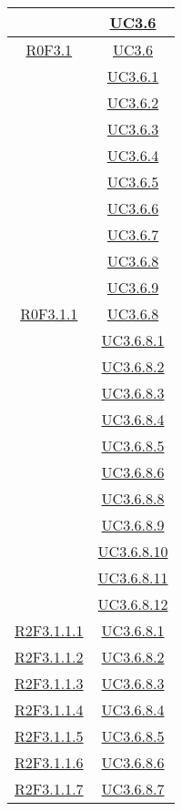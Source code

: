 \begin{longtable}{|c|c|}
& \hyperlink{UC3.6}{UC3.6}\\
\hline
\hyperlink{R0F3.1}{R0F3.1} & \hyperlink{UC3.6}{UC3.6}\\
& \hyperlink{UC3.6.1}{UC3.6.1}\\
& \hyperlink{UC3.6.2}{UC3.6.2}\\
& \hyperlink{UC3.6.3}{UC3.6.3}\\
& \hyperlink{UC3.6.4}{UC3.6.4}\\
& \hyperlink{UC3.6.5}{UC3.6.5}\\
& \hyperlink{UC3.6.6}{UC3.6.6}\\
& \hyperlink{UC3.6.7}{UC3.6.7}\\
& \hyperlink{UC3.6.8}{UC3.6.8}\\
& \hyperlink{UC3.6.9}{UC3.6.9}\\
\hline
\hyperlink{R0F3.1.1}{R0F3.1.1} & \hyperlink{UC3.6.8}{UC3.6.8}\\
& \hyperlink{UC3.6.8.1}{UC3.6.8.1}\\
& \hyperlink{UC3.6.8.2}{UC3.6.8.2}\\
& \hyperlink{UC3.6.8.3}{UC3.6.8.3}\\
& \hyperlink{UC3.6.8.4}{UC3.6.8.4}\\
& \hyperlink{UC3.6.8.5}{UC3.6.8.5}\\
& \hyperlink{UC3.6.8.6}{UC3.6.8.6}\\
& \hyperlink{UC3.6.8.8}{UC3.6.8.8}\\
& \hyperlink{UC3.6.8.9}{UC3.6.8.9}\\
& \hyperlink{UC3.6.8.10}{UC3.6.8.10}\\
& \hyperlink{UC3.6.8.11}{UC3.6.8.11}\\
& \hyperlink{UC3.6.8.12}{UC3.6.8.12}\\
\hline
\hyperlink{R2F3.1.1.1}{R2F3.1.1.1} & \hyperlink{UC3.6.8.1}{UC3.6.8.1}\\
\hline
\hyperlink{R2F3.1.1.2}{R2F3.1.1.2} & \hyperlink{UC3.6.8.2}{UC3.6.8.2}\\
\hline
\hyperlink{R2F3.1.1.3}{R2F3.1.1.3} & \hyperlink{UC3.6.8.3}{UC3.6.8.3}\\
\hline
\hyperlink{R2F3.1.1.4}{R2F3.1.1.4} & \hyperlink{UC3.6.8.4}{UC3.6.8.4}\\
\hline
\hyperlink{R2F3.1.1.5}{R2F3.1.1.5} & \hyperlink{UC3.6.8.5}{UC3.6.8.5}\\
\hline
\hyperlink{R2F3.1.1.6}{R2F3.1.1.6} & \hyperlink{UC3.6.8.6}{UC3.6.8.6}\\
\hline
\hyperlink{R2F3.1.1.7}{R2F3.1.1.7} & \hyperlink{UC3.6.8.7}{UC3.6.8.7}\\

\end{longtable}
